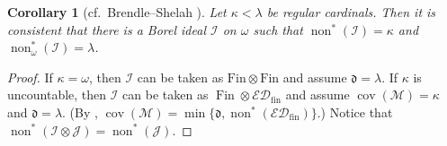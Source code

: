 \documentclass[a4paper,12pt]{amsart}
\newtheorem{cor}[thm]{Corollary}
\theoremstyle{definition}
\numberwithin{thm}{section}
\numberwithin{equation}{section}
\newcommand{\dd}{\mathfrak{d}}
\DeclareMathOperator{\non}{non}
\DeclareMathOperator{\cov}{cov}
\newcommand{\covm}{\cov(\mathcal{M})}
\newcommand{\I}{\mathscr{I}}
\newcommand{\J}{\mathscr{J}}
\DeclareMathOperator{\Fin}{Fin}
\newcommand{\edfin}{\mathcal{ED}_\mathrm{fin}}
\newcommand{\finfin}{\mathrm{Fin}\otimes\mathrm{Fin}}
\begin{document}
    \begin{cor}[cf.\ Brendle--Shelah {\cite[Corollary 5.3]{BS99}}]\label{cor:nonstar_vs_nonstar_omega}
        Let $\kappa < \lambda$ be regular cardinals. Then it is consistent that there is a Borel ideal $\I$ on $\omega$ such that $\non^*(\I) = \kappa$ and $\non^*_\omega(\I) = \lambda$.
    \end{cor}
    \begin{proof}
        If $\kappa = \omega$, then $\I$ can be taken as $\finfin$ and assume $\dd=\lambda$. If $\kappa$ is uncountable, then $\I$ can be taken as $\Fin\otimes\edfin$ and assume $\covm=\kappa$ and $\dd=\lambda$. (By \cite[Proposition 3.6]{HMM10}, $\covm=\min\{\dd,\non^*(\edfin)\}$.) Notice that $\non^*(\I\otimes\J) = \non^*(\J)$.
    \end{proof}
\end{document}

